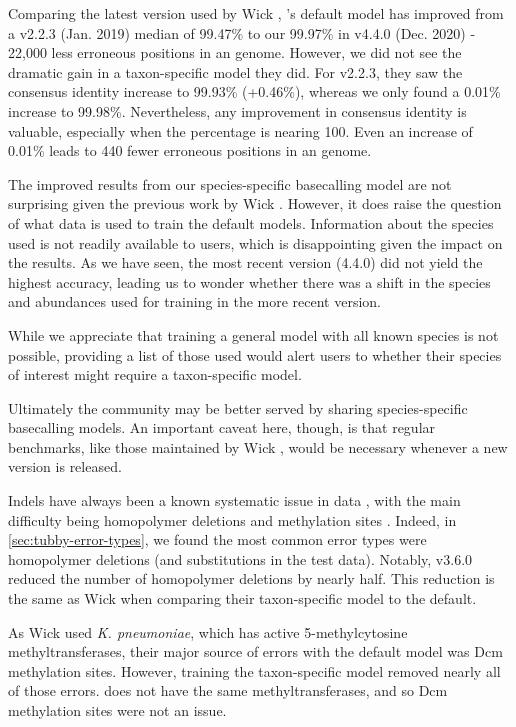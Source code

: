 Comparing the latest version used by Wick \etal{}, \guppy{}'s default model has improved from a v2.2.3 (Jan. 2019) median of 99.47\% to our 99.97\% in v4.4.0 (Dec. 2020) - 22,000 less erroneous positions in an \mtb{} genome. However, we did not see the dramatic gain in a taxon-specific model they did. For \guppy{} v2.2.3, they saw the consensus identity increase to 99.93\% (+0.46\%), whereas we only found a 0.01\% increase to 99.98\%. Nevertheless, any improvement in consensus identity is valuable, especially when the percentage is nearing 100. Even an increase of 0.01\% leads to 440 fewer erroneous positions in an \mtb{} genome.

\noindent
The improved results from our species-specific basecalling model are not surprising given the previous work by Wick \etal{} \cite{wick2019}. However, it does raise the question of what data is used to train the default \guppy{} models. Information about the species used is not readily available to users, which is disappointing given the impact on the results. As we have seen, the most recent \guppy{} version (4.4.0) did not yield the highest accuracy, leading us to wonder whether there was a shift in the species and abundances used for training in the more recent version.

While we appreciate that training a general model with all known species is not possible, providing a list of those used would alert users to whether their species of interest might require a taxon-specific model.

Ultimately the \ont{} community may be better served by sharing species-specific basecalling models. An important caveat here, though, is that regular benchmarks, like those maintained by Wick \etal{} \cite{wick2019,wick2020}, would be necessary whenever a new \guppy{} version is released. 

\noindent
Indels have always been a known systematic issue in \ont{} data \cite{watson2019}, with the main difficulty being homopolymer deletions and methylation sites \cite{wick2019,jain2018}. Indeed, in \autoref{sec:tubby-error-types}, we found the most common error types were homopolymer deletions (and substitutions in the test data). Notably, \tubby{} v3.6.0 reduced the number of homopolymer deletions by nearly half. This reduction is the same as Wick \etal{} when comparing their taxon-specific model to the default. 

As Wick \etal{} used \textit{K. pneumoniae}, which has active 5-methylcytosine methyltransferases, their major source of errors with the default \guppy{} model was Dcm methylation sites. However, training the taxon-specific model removed nearly all of those errors. \mtb{} does not have the same methyltransferases, and so Dcm methylation sites were not an issue.

